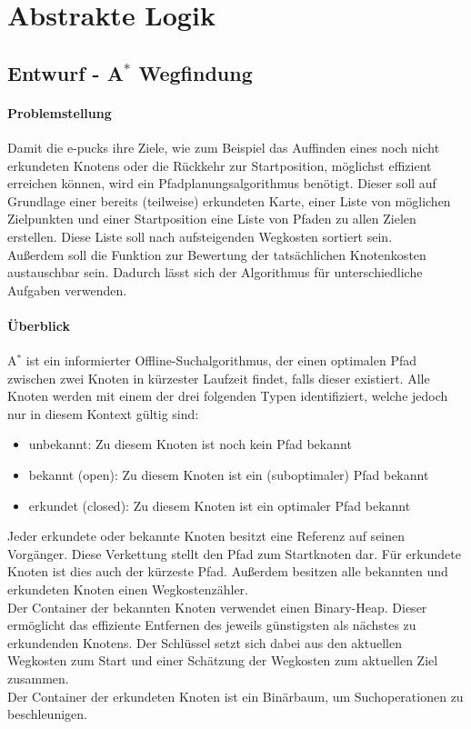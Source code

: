 \documentclass[10pt,a4paper]{article}
\let\oldsection\section
\renewcommand{\section}{\newpage \oldsection}
\begin{document}
	\section{Abstrakte Logik}

	\subsection{Entwurf - A$^\ast$ Wegfindung}
		\paragraph{Problemstellung}
			Damit die e-pucks ihre Ziele, wie zum Beispiel das Auffinden eines noch nicht erkundeten Knotens oder die 
			Rückkehr zur Startposition, möglichst effizient erreichen können, wird ein Pfadplanungsalgorithmus benötigt. 
			Dieser soll auf Grundlage einer bereits (teilweise) erkundeten Karte, einer Liste von möglichen Zielpunkten 
			und einer Startposition eine Liste von Pfaden zu allen Zielen erstellen. Diese Liste soll nach aufsteigenden 
			Wegkosten sortiert sein. \\
			Außerdem soll die Funktion zur Bewertung der tatsächlichen Knotenkosten austauschbar sein. Dadurch lässt 
			sich der Algorithmus für unterschiedliche Aufgaben verwenden.
		\paragraph{Überblick}
			A$^\ast$ ist ein informierter Offline-Suchalgorithmus, der einen optimalen Pfad zwischen zwei Knoten in kürzester 
			Laufzeit findet, falls dieser existiert. Alle Knoten werden mit einem der drei folgenden Typen 
			identifiziert, welche jedoch nur in diesem Kontext gültig sind:
			\begin{itemize}
				\item unbekannt: Zu diesem Knoten ist noch kein Pfad bekannt
				\item bekannt (open): Zu diesem Knoten ist ein (suboptimaler) Pfad bekannt
				\item erkundet (closed): Zu diesem Knoten ist ein optimaler Pfad bekannt
			\end{itemize}

			Jeder erkundete oder bekannte Knoten besitzt eine Referenz auf seinen Vorgänger. Diese Verkettung stellt den 
			Pfad zum Startknoten dar. Für erkundete Knoten ist dies auch der kürzeste Pfad. Außerdem besitzen alle 
			bekannten und erkundeten Knoten einen Wegkostenzähler. \\
			Der Container der bekannten Knoten verwendet einen Binary-Heap. Dieser ermöglicht das effiziente Entfernen
			des jeweils günstigsten als nächstes zu erkundenden Knotens. Der Schlüssel setzt sich dabei aus den 
			aktuellen Wegkosten zum Start und einer Schätzung der Wegkosten zum aktuellen Ziel zusammen. \\
			Der Container der erkundeten Knoten ist ein Binärbaum, um Suchoperationen zu beschleunigen.
\end{document}
